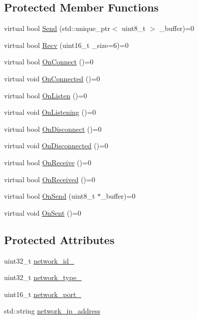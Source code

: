 \subsection*{Protected Member Functions}
\begin{DoxyCompactItemize}
\item 
virtual bool \hyperlink{classINetwork_ab7738d2dffb9aad6260fca88c0c84e38}{Send} (std\+::unique\+\_\+ptr$<$ uint8\+\_\+t $>$ \+\_\+buffer)=0
\item 
virtual bool \hyperlink{classINetwork_aff58817dbf43572dff6784187e1dc128}{Recv} (uint16\+\_\+t \+\_\+size=6)=0
\item 
virtual bool \hyperlink{classINetwork_a98765191b21294b10ef55b164fccba68}{On\+Connect} ()=0
\item 
virtual void \hyperlink{classINetwork_ad5ed4b018281bf80253c62fb85c2a4b0}{On\+Connected} ()=0
\item 
virtual bool \hyperlink{classINetwork_af584043f1045c9da0eb6c21ebf1a29df}{On\+Listen} ()=0
\item 
virtual void \hyperlink{classINetwork_a5d65c0819ad2fadb745319d1d16a6f3d}{On\+Listening} ()=0
\item 
virtual bool \hyperlink{classINetwork_af73c81a512e929292a17ac4e513278e0}{On\+Disconnect} ()=0
\item 
virtual void \hyperlink{classINetwork_ad2157eb3fcf7e65a272ab5bb21791c68}{On\+Disconnected} ()=0
\item 
virtual bool \hyperlink{classINetwork_a7c7d806e714b1b2864e4841af5bb744c}{On\+Receive} ()=0
\item 
virtual bool \hyperlink{classINetwork_af9f74cbe26deddffebde1943c3969086}{On\+Received} ()=0
\item 
virtual bool \hyperlink{classINetwork_a327d045f1e37d2996c121eb7b09b59a0}{On\+Send} (uint8\+\_\+t $\ast$\+\_\+buffer)=0
\item 
virtual void \hyperlink{classINetwork_a863af3061bc113972f0c0fbfd48d15b4}{On\+Sent} ()=0
\end{DoxyCompactItemize}
\subsection*{Protected Attributes}
\begin{DoxyCompactItemize}
\item 
uint32\+\_\+t \hyperlink{classINetwork_a4c919a79e61e5b2ea107ffbe5da64edb}{network\+\_\+id\+\_\+}
\item 
uint32\+\_\+t \hyperlink{classINetwork_ac427f5a6bf1e2b9b375c12d839d4f11f}{network\+\_\+type\+\_\+}
\item 
uint16\+\_\+t \hyperlink{classINetwork_adde67598162e5b350454a49c9136c500}{network\+\_\+port\+\_\+}
\item 
std\+::string \hyperlink{classINetwork_a17f3c5cfeede0a839162320cb0bdd042}{network\+\_\+ip\+\_\+address}
\end{DoxyCompactItemize}


